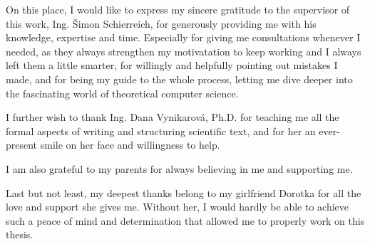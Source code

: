 \documentclass[english,bachelor,unicode]{ctufit-thesis}
\theoremstyle{plain}
\theoremstyle{definition}
\theoremstyle{remark}
\numberwithin{theorem}{chapter}
\begin{document}
 
\frontmatter\frontmatterinit %


\thispagestyle{empty}\cleardoublepage\maketitle %

\imprintpage %

\tableofcontents %


\listoffigures %
\begingroup
\let\clearpage\relax
\endgroup


\begin{acknowledgmentpage}
    On this place, I would like to express my sincere gratitude to the supervisor of this work, Ing. Šimon Schierreich,
    for generously providing me with his knowledge, expertise and time.
    Especially for giving me consultations whenever I needed, as
    they always strengthen my motivatation to keep working and I always left them a little smarter,
    for willingly and helpfully pointing out mistakes I made, and
    for being my guide to the whole process, letting me dive deeper into the fascinating world of
    theoretical computer science.

    I further wish to thank Ing. Dana Vynikarová, Ph.D. for teaching me all the formal aspects of writing
    and structuring scientific text, and for her an ever-present smile on her face
    and willingness to help.

    I am also grateful to my parents for always believing in me and supporting me.

    Last but not least, my deepest thanks belong to my girlfriend Dorotka for all the love and support she gives me.
    Without her, I would hardly be able to achieve such a peace of mind and determination that
    allowed me to properly work on this thesis.
\end{acknowledgmentpage} 
\end{document}
